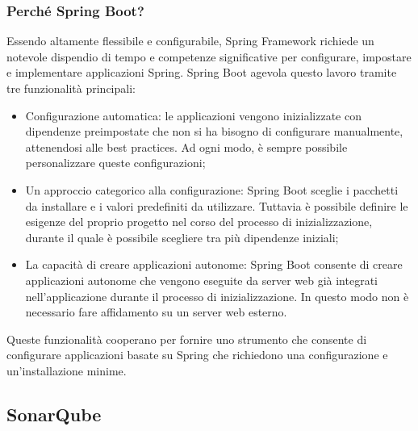             \subsubsection{Perché Spring Boot?}
                Essendo altamente flessibile e configurabile, Spring Framework richiede un notevole dispendio di tempo e competenze significative per configurare, impostare e implementare applicazioni Spring. Spring Boot agevola questo lavoro tramite tre funzionalità principali:
                \begin{itemize}
                    \item Configurazione automatica: le applicazioni vengono inizializzate con dipendenze preimpostate che non si ha bisogno di configurare manualmente, attenendosi alle best practices. Ad ogni modo, è sempre possibile personalizzare queste configurazioni;
                    \item Un approccio categorico alla configurazione: Spring Boot sceglie i pacchetti da installare e i valori predefiniti da utilizzare. Tuttavia è possibile definire le esigenze del proprio progetto nel corso del processo di inizializzazione, durante il quale è possibile scegliere tra più dipendenze iniziali;
                    \item La capacità di creare applicazioni autonome: Spring Boot consente di creare applicazioni autonome che vengono eseguite da server web già integrati nell'applicazione durante il processo di inizializzazione. In questo modo non è necessario fare affidamento su un server web esterno.
                \end{itemize}
                Queste funzionalità cooperano per fornire uno strumento che consente di configurare applicazioni basate su Spring che richiedono una configurazione e un'installazione minime.

    \subsection{SonarQube}
